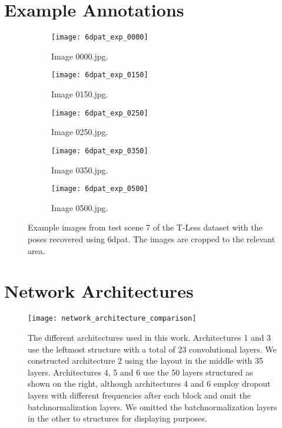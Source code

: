 \begin{appendices}

\chapter{Example Annotations} \label{appendix:example_annotations}

\begin{figure}[!tbp]
	\centering
	\vspace{5mm}
	\begin{subfigure}[t]{0.47\textwidth}
		\centering
    	\texttt{[image: 6dpat\_exp\_0000]}
    	\caption{Image 0000.jpg.}
	\end{subfigure}
	\hfill
	\begin{subfigure}[t]{0.47\textwidth}
		\centering
    	\texttt{[image: 6dpat\_exp\_0150]}
    	\caption{Image 0150.jpg.}
	\end{subfigure}
	\par\bigskip
	\begin{subfigure}[t]{0.47\textwidth}
		\centering
    	\texttt{[image: 6dpat\_exp\_0250]}
    	\caption{Image 0250.jpg.}
	\end{subfigure}
	\hfill
	\begin{subfigure}[t]{0.47\textwidth}
		\centering
    	\texttt{[image: 6dpat\_exp\_0350]}
    	\caption{Image 0350.jpg.}
	\end{subfigure}
	\par\bigskip
	\begin{subfigure}[t]{0.47\textwidth}
		\centering
    	\texttt{[image: 6dpat\_exp\_0500]}
    	\caption{Image 0500.jpg.}
	\end{subfigure}
	\caption{Example images from test scene 7 of the T-Less dataset with the poses recovered using \ac{6dpat}. The images are cropped to the relevant area.}
\end{figure} 

\chapter{Network Architectures} \label{appendix:network_architectures}

\begin{figure}[!tbp]
	\centering
    \texttt{[image: network\_architecture\_comparison]}
    \caption{The different architectures used in this work. Architectures 1 and 3 use the leftmost structure with a total of 23 convolutional layers. We constructed architecture 2 using the layout in the middle with 35 layers. Architectures 4, 5 and 6 use the 50 layers structured as shown on the right, although architectures 4 and 6 employ dropout layers with different frequencies after each block and omit the batchnormalization layers. We omitted the batchnormalization layers in the other to structures for displaying purposes.}
    \label{fig:network_architecture_comparison}
\end{figure} 


\end{appendices}

